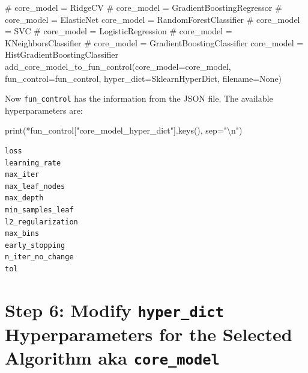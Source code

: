 \documentclass[
  letterpaper,
  DIV=11,
  numbers=noendperiod]{scrreprt}
\newenvironment{Shaded}{\begin{snugshade}}{\end{snugshade}}
\newcommand{\BuiltInTok}[1]{\textcolor[rgb]{0.00,0.23,0.31}{#1}}
\newcommand{\CharTok}[1]{\textcolor[rgb]{0.13,0.47,0.30}{#1}}
\newcommand{\CommentTok}[1]{\textcolor[rgb]{0.37,0.37,0.37}{#1}}
\newcommand{\NormalTok}[1]{\textcolor[rgb]{0.00,0.23,0.31}{#1}}
\newcommand{\OperatorTok}[1]{\textcolor[rgb]{0.37,0.37,0.37}{#1}}
\newcommand{\StringTok}[1]{\textcolor[rgb]{0.13,0.47,0.30}{#1}}
\newcommand{\VariableTok}[1]{\textcolor[rgb]{0.07,0.07,0.07}{#1}}
\begin{document}
\begin{Shaded}
\begin{Highlighting}[]
\CommentTok{\# core\_model  = RidgeCV}
\CommentTok{\# core\_model = GradientBoostingRegressor}
\CommentTok{\# core\_model = ElasticNet}
\NormalTok{core\_model }\OperatorTok{=}\NormalTok{ RandomForestClassifier}
\CommentTok{\# core\_model = SVC}
\CommentTok{\# core\_model = LogisticRegression}
\CommentTok{\# core\_model = KNeighborsClassifier}
\CommentTok{\# core\_model = GradientBoostingClassifier}
\NormalTok{core\_model }\OperatorTok{=}\NormalTok{ HistGradientBoostingClassifier}
\NormalTok{add\_core\_model\_to\_fun\_control(core\_model}\OperatorTok{=}\NormalTok{core\_model,}
\NormalTok{                              fun\_control}\OperatorTok{=}\NormalTok{fun\_control,}
\NormalTok{                              hyper\_dict}\OperatorTok{=}\NormalTok{SklearnHyperDict,}
\NormalTok{                              filename}\OperatorTok{=}\VariableTok{None}\NormalTok{)}
\end{Highlighting}
\end{Shaded}

Now \texttt{fun\_control} has the information from the JSON file. The
available hyperparameters are:

\begin{Shaded}
\begin{Highlighting}[]
\BuiltInTok{print}\NormalTok{(}\OperatorTok{*}\NormalTok{fun\_control[}\StringTok{"core\_model\_hyper\_dict"}\NormalTok{].keys(), sep}\OperatorTok{=}\StringTok{"}\CharTok{\textbackslash{}n}\StringTok{"}\NormalTok{)}
\end{Highlighting}
\end{Shaded}

\begin{verbatim}
loss
learning_rate
max_iter
max_leaf_nodes
max_depth
min_samples_leaf
l2_regularization
max_bins
early_stopping
n_iter_no_change
tol
\end{verbatim}

\hypertarget{step-6-modify-hyper_dict-hyperparameters-for-the-selected-algorithm-aka-core_model-2}{%
\section{\texorpdfstring{Step 6: Modify \texttt{hyper\_dict}
Hyperparameters for the Selected Algorithm aka
\texttt{core\_model}}{Step 6: Modify hyper\_dict Hyperparameters for the Selected Algorithm aka core\_model}}\label{step-6-modify-hyper_dict-hyperparameters-for-the-selected-algorithm-aka-core_model-2}}
\end{document}
